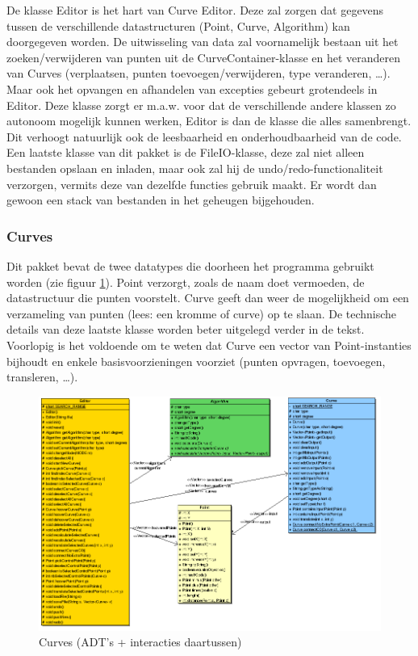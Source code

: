 \documentclass[a4paper,11pt,oneside, titlepage]{article}
\begin{document}
De klasse Editor is het hart van Curve Editor. Deze zal zorgen dat gegevens tussen de verschillende datastructuren (Point, Curve, Algorithm) kan doorgegeven worden.
De uitwisseling van data zal voornamelijk bestaan uit het zoeken/verwijderen van punten uit de CurveContainer-klasse en het veranderen van Curves (verplaatsen, punten toevoegen/verwijderen, type veranderen, \ldots).
Maar ook het opvangen en afhandelen van excepties gebeurt grotendeels in Editor. Deze klasse zorgt er m.a.w. voor dat de 
verschillende andere klassen zo autonoom mogelijk kunnen werken, Editor is dan de klasse die alles samenbrengt. Dit verhoogt natuurlijk ook de leesbaarheid en onderhoudbaarheid van de code.\newline \newline
Een laatste klasse van dit pakket is de FileIO-klasse, deze zal niet alleen bestanden opslaan en
inladen, maar ook zal hij de undo/redo-functionaliteit verzorgen, vermits deze van
dezelfde functies gebruik maakt. Er wordt dan gewoon een stack van bestanden in het geheugen bijgehouden.
\subsubsection{Curves}
Dit pakket bevat de twee datatypes die doorheen het programma gebruikt worden (zie figuur \ref{iCurv}). Point verzorgt, zoals
de naam doet vermoeden, de datastructuur die punten voorstelt. Curve geeft dan weer de
mogelijkheid om een verzameling van punten (lees: een kromme of curve) op te slaan. De
technische details van deze laatste klasse worden beter uitgelegd verder in de tekst. 
Voorlopig is het voldoende om te weten dat Curve een vector van Point-instanties bijhoudt en enkele
basisvoorzieningen voorziet (punten opvragen, toevoegen, transleren, \ldots).
\begin{figure}[htbp]
\centering
\includegraphics[scale=0.5]{./UML2/Gen.png}
\caption{Curves (ADT's + interacties daartussen)}\label{iCurv}
\end{figure}
\end{document}
